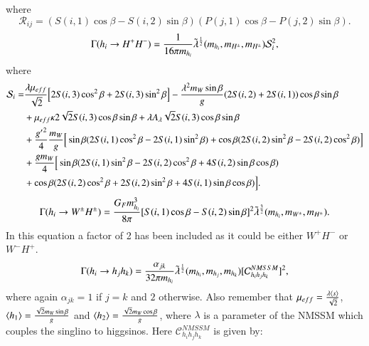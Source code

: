 \documentclass[final,3p,times,pdflatex]{elsarticle}
\begin{document}
where
\begin{equation}
\mathcal{R}_{ij} = (S(i,1)\cos\beta - S(i,2)\sin\beta)(P(j,1)\cos\beta - P(j,2)\sin\beta).
\end{equation}
\begin{equation} \label{hHpmHpmNMSSM}
\Gamma(h_i \rightarrow H^+ H^-) = {1 \over 16 \pi m_{h_i}} \tilde{\lambda}^{1 \over 2}(m_{h_i},m_{H^{\pm}},m_{H^{\pm}}) \mathcal{S}_{i}^2,
\end{equation}
where
\begin{equation}
\begin{aligned}
\mathcal{S}_i = & {\lambda \mu_{eff} \over \sqrt{2}}\Big[2S(i,3)\cos^2 \beta + 2S(i,3) \sin^2 \beta\Big] - {\lambda^2 m_{W} \sin\beta \over g}(2S(i,2) + 2S(i,1))\cos\beta \sin\beta \\ & + \mu_{eff} \kappa 2\sqrt{2}S(i,3)\cos\beta \sin\beta  + \lambda A_{\lambda} \sqrt{2} S(i,3)\cos\beta \sin\beta \\ & + {{g'}^2 \over 4}{m_{W} \over g}\Big[\sin\beta (2S(i,1)\cos^2 \beta - 2S(i,1)\sin^2 \beta) + \cos\beta(2S(i,2)\sin^2 \beta - 2S(i,2) \cos^2 \beta)\Big] \\ & + {g m_{W} \over 4}\Big[\sin\beta(2S(i,1) \sin^2 \beta - 2S(i,2)\cos^2 \beta + 4S(i,2)\sin\beta\cos\beta) \\ & + \cos\beta(2S(i,2) \cos^2 \beta + 2S(i,2)\sin^2 \beta + 4S(i,1)\sin\beta \cos\beta)\Big].
\end{aligned}
\end{equation}
\begin{equation} \label{hWHpmNMSSM}
\Gamma(h_{i} \rightarrow W^{\pm} H^{\pm}) = {G_{F} m_{h_i}^3 \over 8 \pi}[S(i,1)\cos\beta - S(i,2)\sin\beta]^2 \tilde{\lambda}^{3 \over 2} (m_{h_i},m_{W^{\pm}},m_{H^{\pm}}).
\end{equation}
In this equation a factor of 2 has been included as it could be either $W^+ H^-$ or $W^- H^+$.
\begin{equation} \label{hHH3NMSSM}
\Gamma(h_i \rightarrow h_j h_k) = {\alpha_{jk} \over 32 \pi m_{h_i}} \tilde{\lambda}^{1 \over 2}(m_{h_{i}},m_{h_{j}}, m_{h_{k}}) [\mathcal{C}_{h_{i}h_{j}h_{k}}^{NMSSM}]^2 ,
\end{equation}
where again $\alpha_{jk} = 1$ if $j=k$ and $2$ otherwise. Also remember that $\mu_{eff} = {\lambda \langle s \rangle \over \sqrt{2}}$, $\langle h_1 \rangle = {\sqrt{2}m_W \sin\beta \over g}$ and $\langle h_2 \rangle = {\sqrt{2}m_W \cos\beta \over g}$, where $\lambda$ is a parameter of the NMSSM which couples the singlino to higgsinos.
Here $\mathcal{C}_{h_{i}h_{j}h_{k}}^{NMSSM}$ is given by:
\end{document}

